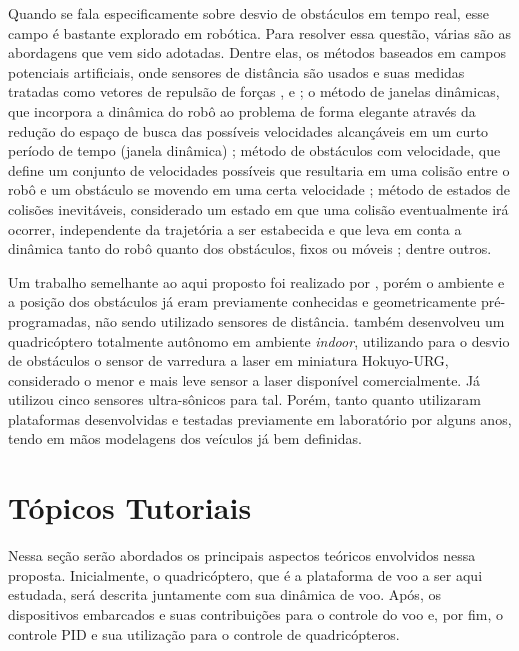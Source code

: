 \documentclass[a4paper, 12pt]{article}
\begin{document}

Quando se fala especificamente sobre desvio de obstáculos em tempo real, esse campo é bastante explorado em robótica. Para resolver essa questão, várias são as abordagens que vem sido adotadas. Dentre elas, os métodos baseados em campos potenciais artificiais,  onde sensores de distância são usados e suas medidas tratadas como vetores de repulsão de forças \cite{Bouktir2008}, \cite{Nieuwenhuisen2013} e \cite{Borenstein1989}; o método de janelas dinâmicas, que incorpora a dinâmica do robô ao problema de forma elegante através da redução do espaço de busca das possíveis velocidades alcançáveis em um curto período de tempo (janela dinâmica) \cite{Fox1997} \cite{Saranrittichai2013}; método de obstáculos com velocidade, que define um conjunto de velocidades possíveis que resultaria em uma colisão entre o robô e um obstáculo se movendo em uma certa velocidade \cite{Fiorini1998} \cite{Claes2012} \cite{Berg2012}; método de estados de colisões inevitáveis, considerado um estado em que uma colisão eventualmente irá ocorrer, independente da trajetória a ser estabecida e que leva em conta a dinâmica tanto do robô quanto dos obstáculos, fixos ou móveis \cite{Fraichard2004}; dentre outros.   

Um trabalho semelhante ao aqui proposto foi realizado por \cite{Israelsen}, porém o ambiente e a posição dos obstáculos já eram previamente conhecidas e geometricamente pré-programadas, não sendo utilizado sensores de distância. \cite{Grzonka2012} também desenvolveu um quadricóptero totalmente autônomo em ambiente \textit{indoor}, utilizando para o desvio de obstáculos o sensor de varredura a laser em miniatura Hokuyo-URG, considerado o menor e mais leve sensor a laser disponível comercialmente. Já \cite{Becker2012} utilizou cinco sensores ultra-sônicos para tal. Porém, tanto \cite{Grzonka2012} quanto \cite{Becker2012} utilizaram plataformas desenvolvidas e testadas previamente em laboratório por alguns anos, tendo em mãos modelagens dos veículos já bem definidas.



\newpage

\section{Tópicos Tutoriais}
\label{sec:tutoriais}

Nessa seção serão abordados os principais aspectos teóricos envolvidos nessa proposta. Inicialmente, 
o quadricóptero, que é a plataforma de voo a ser aqui estudada, será descrita juntamente com sua dinâmica de voo. Após, os dispositivos embarcados e suas contribuições para o controle do voo e, por fim, o controle PID e sua utilização para o controle de quadricópteros.
\end{document}
